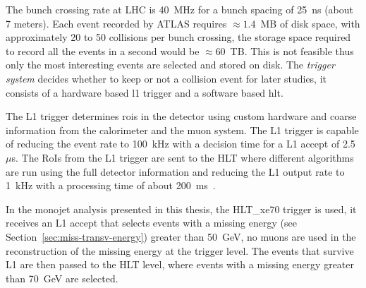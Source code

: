 The bunch crossing rate at LHC is 40~MHz for a bunch spacing of 25~ns (about 7
meters). Each event recorded by ATLAS requires $\approx 1.4$~MB of disk space,
with approximately 20 to 50 collisions per bunch crossing, the storage space
required to record all the events in a second would be $\approx 60$~TB. This is
not feasible thus only the most interesting events are selected and stored on
disk. The \emph{trigger system} decides whether to keep or not a collision event
for later studies, it consists of a hardware based \gls{l1} trigger and a
software based \gls{hlt}.

The L1 trigger determines \gls{rois} in the detector using custom hardware and
coarse information from the calorimeter and the muon system. The L1 trigger is
capable of reducing the event rate to 100~kHz with a decision time for a L1
accept of 2.5~$\mu$s. The RoIs from the L1 trigger are sent to the HLT where
different algorithms are run using the full detector information and reducing
the L1 output rate to 1~kHz with a processing time of about
200~ms~\cite{trigger}. %

In the monojet analysis presented in this thesis, the HLT\_xe70 trigger is used,
it receives an L1 accept that selects events with a missing energy (see
Section~\ref{sec:miss-transv-energy}) greater than 50~GeV, no muons are used in
the reconstruction of the missing energy at the trigger level. The events that
survive L1 are then passed to the HLT level, where events with a missing energy
greater than 70~GeV are selected.
